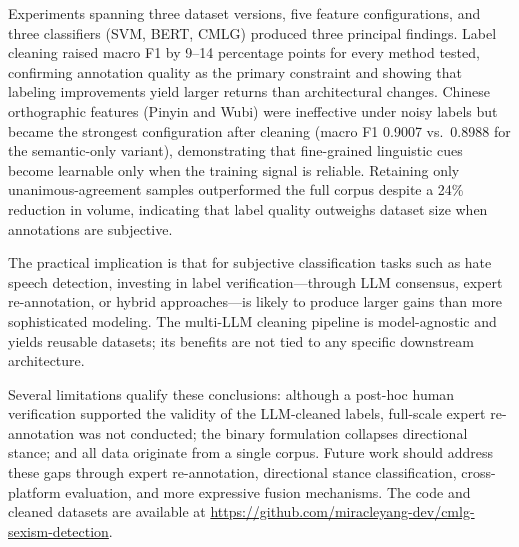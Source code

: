 ﻿\documentclass[12pt]{article}
\begin{document}
Experiments spanning three dataset versions, five feature configurations, and three classifiers (SVM, BERT, CMLG) produced three principal findings. Label cleaning raised macro F1 by 9--14 percentage points for every method tested, confirming annotation quality as the primary constraint and showing that labeling improvements yield larger returns than architectural changes. Chinese orthographic features (Pinyin and Wubi) were ineffective under noisy labels but became the strongest configuration after cleaning (macro F1 0.9007 vs.\ 0.8988 for the semantic-only variant), demonstrating that fine-grained linguistic cues become learnable only when the training signal is reliable. Retaining only unanimous-agreement samples outperformed the full corpus despite a 24\% reduction in volume, indicating that label quality outweighs dataset size when annotations are subjective.

The practical implication is that for subjective classification tasks such as hate speech detection, investing in label verification---through LLM consensus, expert re-annotation, or hybrid approaches---is likely to produce larger gains than more sophisticated modeling. The multi-LLM cleaning pipeline is model-agnostic and yields reusable datasets; its benefits are not tied to any specific downstream architecture.

Several limitations qualify these conclusions: although a post-hoc human verification supported the validity of the LLM-cleaned labels, full-scale expert re-annotation was not conducted; the binary formulation collapses directional stance; and all data originate from a single corpus. Future work should address these gaps through expert re-annotation, directional stance classification, cross-platform evaluation, and more expressive fusion mechanisms. The code and cleaned datasets are available at \url{https://github.com/miracleyang-dev/cmlg-sexism-detection}.

\printbibliography
\end{document}
